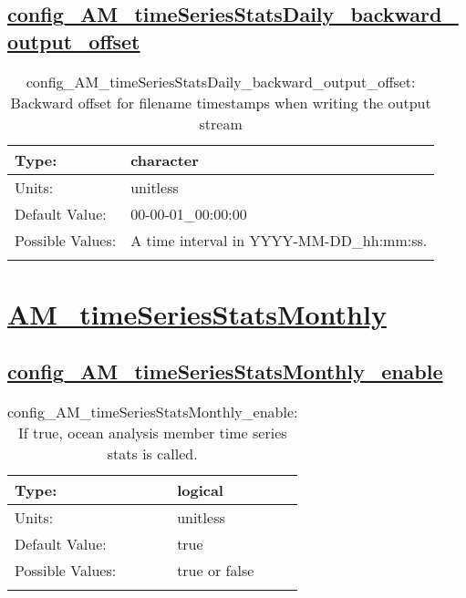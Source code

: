 \subsection[config\_AM\_timeSeriesStatsDaily\_backward\_output\_offset]{\hyperref[sec:nm_tab_AM_timeSeriesStatsDaily]{config\_AM\_timeSeriesStatsDaily\_backward\_output\_offset}}
\label{subsec:nm_sec_config_AM_timeSeriesStatsDaily_backward_output_offset}
\begin{center}
\begin{longtable}{| p{2.0in} || p{4.0in} |}
    \hline
    Type: & character \\
    \hline
    Units: & \si{unitless} \\
    \hline
    Default Value: & 00-00-01\_00:00:00 \\
    \hline
    Possible Values: & A time interval in YYYY-MM-DD\_hh:mm:ss. \\
    \hline
    \caption{config\_AM\_timeSeriesStatsDaily\_backward\_output\_offset: Backward offset for filename timestamps when writing the output stream}
\end{longtable}
\end{center}
\section[AM\_timeSeriesStatsMonthly]{\hyperref[sec:nm_tab_AM_timeSeriesStatsMonthly]{AM\_timeSeriesStatsMonthly}}
\label{sec:nm_sec_AM_timeSeriesStatsMonthly}
\subsection[config\_AM\_timeSeriesStatsMonthly\_enable]{\hyperref[sec:nm_tab_AM_timeSeriesStatsMonthly]{config\_AM\_timeSeriesStatsMonthly\_enable}}
\label{subsec:nm_sec_config_AM_timeSeriesStatsMonthly_enable}
\begin{center}
\begin{longtable}{| p{2.0in} || p{4.0in} |}
    \hline
    Type: & logical \\
    \hline
    Units: & \si{unitless} \\
    \hline
    Default Value: & true \\
    \hline
    Possible Values: & true or false \\
    \hline
    \caption{config\_AM\_timeSeriesStatsMonthly\_enable: If true, ocean analysis member time series stats is called.}
\end{longtable}
\end{center}

